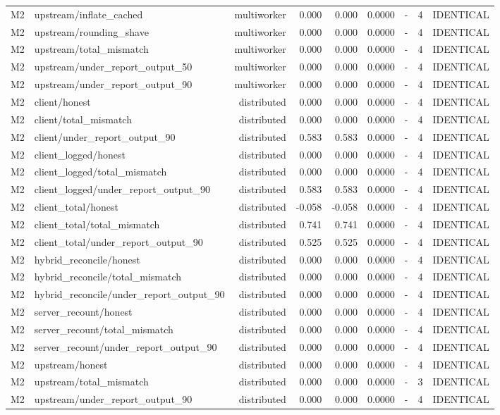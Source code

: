\begin{table}[t]
{\begin{tabular}{llrrrrrrr}
M2 & upstream/inflate\_cached & multiworker & 0.000 & 0.000 & 0.0000 & - & 4 & IDENTICAL \\
M2 & upstream/rounding\_shave & multiworker & 0.000 & 0.000 & 0.0000 & - & 4 & IDENTICAL \\
M2 & upstream/total\_mismatch & multiworker & 0.000 & 0.000 & 0.0000 & - & 4 & IDENTICAL \\
M2 & upstream/under\_report\_output\_50 & multiworker & 0.000 & 0.000 & 0.0000 & - & 4 & IDENTICAL \\
M2 & upstream/under\_report\_output\_90 & multiworker & 0.000 & 0.000 & 0.0000 & - & 4 & IDENTICAL \\
M2 & client/honest & distributed & 0.000 & 0.000 & 0.0000 & - & 4 & IDENTICAL \\
M2 & client/total\_mismatch & distributed & 0.000 & 0.000 & 0.0000 & - & 4 & IDENTICAL \\
M2 & client/under\_report\_output\_90 & distributed & 0.583 & 0.583 & 0.0000 & - & 4 & IDENTICAL \\
M2 & client\_logged/honest & distributed & 0.000 & 0.000 & 0.0000 & - & 4 & IDENTICAL \\
M2 & client\_logged/total\_mismatch & distributed & 0.000 & 0.000 & 0.0000 & - & 4 & IDENTICAL \\
M2 & client\_logged/under\_report\_output\_90 & distributed & 0.583 & 0.583 & 0.0000 & - & 4 & IDENTICAL \\
M2 & client\_total/honest & distributed & -0.058 & -0.058 & 0.0000 & - & 4 & IDENTICAL \\
M2 & client\_total/total\_mismatch & distributed & 0.741 & 0.741 & 0.0000 & - & 4 & IDENTICAL \\
M2 & client\_total/under\_report\_output\_90 & distributed & 0.525 & 0.525 & 0.0000 & - & 4 & IDENTICAL \\
M2 & hybrid\_reconcile/honest & distributed & 0.000 & 0.000 & 0.0000 & - & 4 & IDENTICAL \\
M2 & hybrid\_reconcile/total\_mismatch & distributed & 0.000 & 0.000 & 0.0000 & - & 4 & IDENTICAL \\
M2 & hybrid\_reconcile/under\_report\_output\_90 & distributed & 0.000 & 0.000 & 0.0000 & - & 4 & IDENTICAL \\
M2 & server\_recount/honest & distributed & 0.000 & 0.000 & 0.0000 & - & 4 & IDENTICAL \\
M2 & server\_recount/total\_mismatch & distributed & 0.000 & 0.000 & 0.0000 & - & 4 & IDENTICAL \\
M2 & server\_recount/under\_report\_output\_90 & distributed & 0.000 & 0.000 & 0.0000 & - & 4 & IDENTICAL \\
M2 & upstream/honest & distributed & 0.000 & 0.000 & 0.0000 & - & 4 & IDENTICAL \\
M2 & upstream/total\_mismatch & distributed & 0.000 & 0.000 & 0.0000 & - & 3 & IDENTICAL \\
M2 & upstream/under\_report\_output\_90 & distributed & 0.000 & 0.000 & 0.0000 & - & 4 & IDENTICAL \\
\bottomrule
\end{tabular}
}
\end{table}
